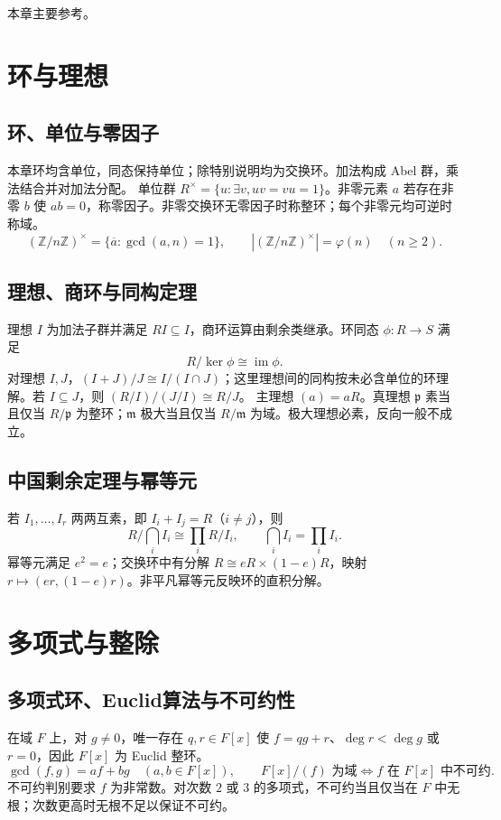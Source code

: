 \documentclass[../main.tex]{subfiles}
\begin{document}
本章主要参考\cite{milneCA,stacks}。

\section{环与理想}
\subsection{环、单位与零因子}
本章环均含单位，同态保持单位；除特别说明均为交换环。加法构成 Abel 群，乘法结合并对加法分配。
单位群 $R^\times=\{u:\exists v,uv=vu=1\}$。非零元素 $a$ 若存在非零 $b$ 使 $ab=0$，称零因子。非零交换环无零因子时称整环；每个非零元均可逆时称域。
\[
(\mathbb Z/n\mathbb Z)^\times=\{\overline a:\gcd(a,n)=1\},\qquad
|(\mathbb Z/n\mathbb Z)^\times|=\varphi(n)\quad(n\ge2).
\]
\subsection{理想、商环与同构定理}
理想 $I$ 为加法子群并满足 $RI\subseteq I$，商环运算由剩余类继承。环同态 $\phi:R\to S$ 满足
\[
R/\ker\phi\cong\operatorname{im}\phi.
\]
对理想 $I,J$，$(I+J)/J\cong I/(I\cap J)$；这里理想间的同构按未必含单位的环理解。若 $I\subseteq J$，则 $(R/I)/(J/I)\cong R/J$。
主理想 $(a)=aR$。真理想 $\mathfrak p$ 素当且仅当 $R/\mathfrak p$ 为整环；$\mathfrak m$ 极大当且仅当 $R/\mathfrak m$ 为域。极大理想必素，反向一般不成立。
\subsection{中国剩余定理与幂等元}
若 $I_1,\ldots,I_r$ 两两互素，即 $I_i+I_j=R$（$i\ne j$），则
\[
R/\bigcap_iI_i\cong\prod_iR/I_i,\qquad\bigcap_iI_i=\prod_iI_i.
\]
幂等元满足 $e^2=e$；交换环中有分解 $R\cong eR\times(1-e)R$，映射 $r\mapsto(er,(1-e)r)$。非平凡幂等元反映环的直积分解。
\section{多项式与整除}
\subsection{多项式环、Euclid算法与不可约性}
在域 $F$ 上，对 $g\ne0$，唯一存在 $q,r\in F[x]$ 使 $f=qg+r$、$\deg r<\deg g$ 或 $r=0$，因此 $F[x]$ 为 Euclid 整环。
\[
\gcd(f,g)=af+bg\quad(a,b\in F[x]),\qquad
F[x]/(f)\text{ 为域}\iff f\text{ 在 }F[x]\text{ 中不可约}.
\]
不可约判别要求 $f$ 为非常数。对次数 $2$ 或 $3$ 的多项式，不可约当且仅当在 $F$ 中无根；次数更高时无根不足以保证不可约。
\end{document}
